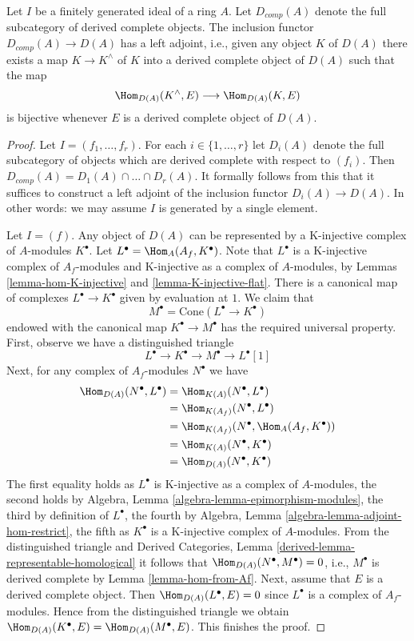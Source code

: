 \begin{lemma}
\label{lemma-derived-completion}
Let $I$ be a finitely generated ideal of a ring $A$. Let $D_{comp}(A)$
denote the full subcategory of derived complete objects.
The inclusion functor $D_{comp}(A) \to D(A)$ has a left adjoint, i.e.,
given any object $K$ of $D(A)$ there exists a map $K \to K^\wedge$
of $K$ into a derived complete object of $D(A)$ such that the map
$$
\Hom_{D(A)}(K^\wedge, E) \longrightarrow \Hom_{D(A)}(K, E)
$$
is bijective whenever $E$ is a derived complete object of $D(A)$.
\end{lemma}

\begin{proof}
Let $I = (f_1, \ldots, f_r)$. For each $i \in \{1, \ldots, r\}$
let $D_i(A)$ denote the full subcategory of objects which are
derived complete with respect to $(f_i)$.
Then $D_{comp}(A) = D_1(A) \cap \ldots \cap D_r(A)$.
It formally follows from this that it suffices to construct
a left adjoint of the inclusion functor $D_i(A) \to D(A)$.
In other words: we may assume $I$ is generated by a single element.

\medskip\noindent
Let $I = (f)$. Any object of $D(A)$ can be represented by a K-injective
complex of $A$-modules $K^\bullet$. Let $L^\bullet = \Hom_A(A_f, K^\bullet)$.
Note that $L^\bullet$ is a K-injective complex of $A_f$-modules and
K-injective as a complex of $A$-modules, by
Lemmas \ref{lemma-hom-K-injective} and \ref{lemma-K-injective-flat}.
There is a canonical map of complexes $L^\bullet \to K^\bullet$
given by evaluation at $1$. We claim that
$$
M^\bullet = \text{Cone}(L^\bullet \to K^\bullet)
$$
endowed with the canonical map $K^\bullet \to M^\bullet$ has the required
universal property. First, observe we have a distinguished triangle
$$
L^\bullet \to K^\bullet \to M^\bullet \to L^\bullet[1]
$$
Next, for any complex of $A_f$-modules $N^\bullet$ we have
\begin{align*}
\Hom_{D(A)}(N^\bullet, L^\bullet)
& =
\Hom_{K(A)}(N^\bullet, L^\bullet) \\
& =
\Hom_{K(A_f)}(N^\bullet, L^\bullet) \\
& =
\Hom_{K(A_f)}(N^\bullet, \Hom_A(A_f, K^\bullet)) \\
& =
\Hom_{K(A)}(N^\bullet, K^\bullet) \\
& =
\Hom_{D(A)}(N^\bullet, K^\bullet)
\end{align*}
The first equality holds as $L^\bullet$ is K-injective as a complex of
$A$-modules, the second holds by
Algebra, Lemma \ref{algebra-lemma-epimorphism-modules},
the third by definition of $L^\bullet$,
the fourth by 
Algebra, Lemma \ref{algebra-lemma-adjoint-hom-restrict},
the fifth as $K^\bullet$ is a K-injective complex of $A$-modules.
From the distinguished triangle and
Derived Categories, Lemma \ref{derived-lemma-representable-homological}
it follows that $\Hom_{D(A)}(N^\bullet, M^\bullet) = 0$, i.e.,
$M^\bullet$ is derived complete by Lemma \ref{lemma-hom-from-Af}.
Next, assume that $E$ is a derived complete object.
Then $\Hom_{D(A)}(L^\bullet, E) = 0$ since $L^\bullet$
is a complex of $A_f$-modules. Hence from the distinguished
triangle we obtain
$\Hom_{D(A)}(K^\bullet, E) = \Hom_{D(A)}(M^\bullet, E)$.
This finishes the proof.
\end{proof}

